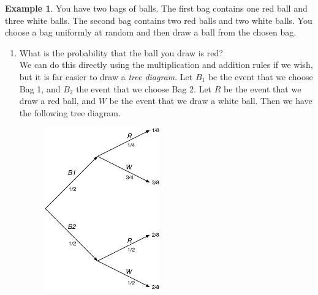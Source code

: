 \documentclass[12pt]{article}
\theoremstyle{definition}
\newtheorem*{example}{Example}
\theoremstyle{remark}
\begin{document}
\begin{example}You have two bags of balls. The first bag contains one red ball and three white balls. The second bag contains two red balls and two white balls. You choose a bag uniformly at random and then draw a ball from the chosen bag.
\begin{enumerate}
\item What is the probability that the ball you draw is red?\\

We can do this directly using the multiplication and addition rules if we wish, but it is far easier to draw a \emph{tree diagram}. Let $B_1$ be the event that we choose Bag 1, and $B_2$ the event that we choose Bag 2. Let $R$ be the event that we draw a red ball, and $W$ be the event that we draw a white ball. Then we have the following tree diagram. 
\begin{figure}[H]
\centering
\includegraphics[width=5cm]{tree1.eps}
\end{figure}


\end{enumerate}
\end{example}
\end{document}
